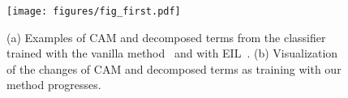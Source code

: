 \begin{figure}[t]
	\centering
    \texttt{[image: figures/fig\_first.pdf]}
    \vspace{-0.5em}
    \caption{(a) Examples of CAM and decomposed terms from the classifier trained with the vanilla method~\cite{zhou2016learning} and with EIL~\cite{mai2020erasing}. (b) Visualization of the changes of CAM and decomposed terms as training with our method progresses.}
    \label{fig:first}
\end{figure}
